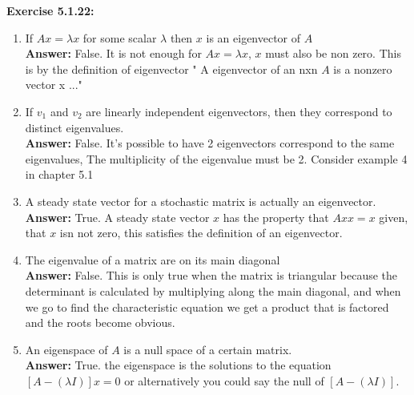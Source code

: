 \documentclass{amsart}
\begin{document}
\vspace{1in}

\noindent\textbf{Exercise 5.1.22: }
\begin{enumerate}
\item If $Ax = \lambda x$ for some scalar $\lambda$ then $x$ is an eigenvector of $A$\\
\noindent \textbf{Answer: }False. It is not enough for $Ax = \lambda x$, $x$ must also be non zero. This is by the definition of eigenvector " A eigenvector of an nxn $A$ is a nonzero vector x ..." 
\vspace{1in}

\item If $v_1$ and $v_2$ are linearly independent eigenvectors, then they correspond to distinct eigenvalues.\\
\noindent \textbf{Answer: } False. It's possible to have 2 eigenvectors correspond to the same eigenvalues, The multiplicity of the eigenvalue must be 2. Consider example 4 in chapter 5.1
\vspace{1in}

\item A steady state vector for a stochastic matrix is actually an eigenvector.\\
\noindent \textbf{Answer: } True. A steady state vector $x$ has the property that $Axx = x$ given, that $x$ isn not zero, this satisfies the definition of an eigenvector. 
\vspace{1in}

\item The eigenvalue of a matrix are on its main diagonal\\
\noindent \textbf{Answer: } False. This is only true when the matrix is triangular because the determinant  is calculated by multiplying along the main diagonal, and when we go to find the characteristic equation we get a product that is factored and the roots become obvious.
\vspace{1in}

\item An eigenspace of $A$ is a null space of a certain matrix.\\
\noindent \textbf{Answer: }True. the eigenspace is the solutions to the equation $[A - (\lambda I)]x = 0$ or alternatively you could say the null of $[A - (\lambda I)]$.
\vspace{1in}
\end{enumerate}
\end{document}
